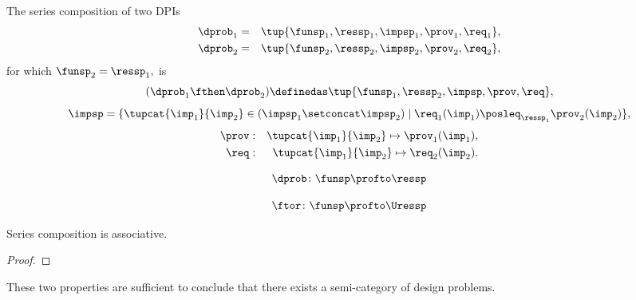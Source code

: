 \begin{definition}
  \label{def:series-composition}The series composition of two DPIs
  \begin{equation}
    \begin{aligned}
    \dprob_{1}&=&\tup{\funsp_{1},\ressp_{1},\impsp_{1},\prov_{1},\req_{1}},
  \\
    \dprob_{2}&=&\tup{\funsp_{2},\ressp_{2},\impsp_{2},\prov_{2},\req_{2}},
  \end{aligned}
  \end{equation}
  for which $\funsp_{2}=\ressp_{1},$ is
  \begin{equation}
    (\dprob_{1} \fthen \dprob_{2})
    \definedas
    \tup{ \funsp_{1},\ressp_{2},\impsp,\prov,\req},
  \end{equation}
  \begin{equation}
    \impsp  =  \{  \tupcat {\imp_{1}} {\imp_{2}} \in (\impsp_{1} \setconcat \impsp_{2})\mid\req_{1}(\imp_{1})\posleq_{\ressp_{1}}\prov_{2}(\imp_{2})\},
  \end{equation}
  \begin{equation}
  \begin{aligned}
    \prov & : & \tupcat {\imp_{1}} {\imp_{2}}   \mapsto\prov_{1}(\imp_{1}),\\
    \req & : & \tupcat {\imp_{1}} {\imp_{2}} \mapsto\req_{2}(\imp_{2}).
  \end{aligned}
  \end{equation}
\end{definition}

\begin{forslides}
\begin{equation}\label{eq:dproba}
  \dprob \colon \funsp \profto \ressp
\end{equation}

\begin{equation}\label{eq:dprob2}
  \ftor \colon \funsp \profto \Uressp
\end{equation}
\end{forslides}

\begin{lemma}
  Series composition is associative.
\end{lemma}
\begin{proof}
\end{proof}

These two properties are sufficient to conclude that there exists a semi-category of design problems.

